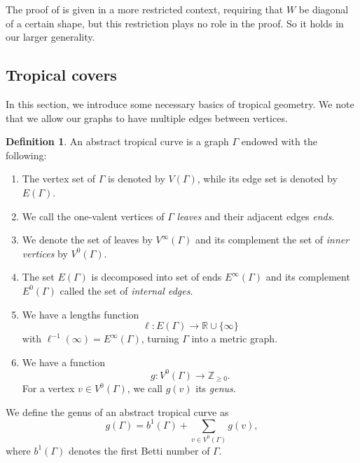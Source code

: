 \documentclass[10pt,a4paper,oneside,no-math,reqno]{amsart}%
\theoremstyle{plain}
\theoremstyle{definition}
\newtheorem{definition}[theorem]{Definition}
\theoremstyle{remark}
\numberwithin{equation}{section}
\newcommand{\1}{\mathds{1}}
\newcommand{\<}{\langle}
\renewcommand{\>}{\rangle}
\begin{document}
The proof of \cite[Proposition 4.1]{BDKS22} is given in a more restricted context, requiring that $W$ be diagonal of a certain shape, but this restriction plays no role in the proof. So it holds in our larger generality.



\subsection{Tropical covers}
\label{sec-tropcov}

In this section, we introduce some necessary basics of tropical geometry.
We note that we allow our graphs to have multiple edges between vertices.


\begin{definition}
    An abstract tropical curve is a graph $\Gamma$ endowed with the following:
    \begin{enumerate}
        \item The vertex set of $\Gamma$ is denoted by $V(\Gamma)$, while its edge set is denoted by $E(\Gamma)$.
        \item We call the one-valent vertices of $\Gamma$ \emph{leaves} and their adjacent edges \emph{ends}.
        \item We denote the set of leaves by $V^\infty(\Gamma)$ and its complement the set of \emph{inner vertices} by $V^0(\Gamma)$.
        \item The set $E(\Gamma)$ is decomposed into set of ends $E^\infty(\Gamma)$ and its complement $E^0(\Gamma)$ called the set of \emph{internal edges}.
        \item We have a lengths function
        \begin{equation}
            \ell \colon E(\Gamma)\to\mathbb{R}\cup\{\infty\}
        \end{equation}
        with $\ell^{-1}(\infty)=E^\infty(\Gamma)$, turning $\Gamma$ into a metric graph.
        \item We have a function
        \begin{equation}
            g \colon V^0(\Gamma)\to\mathbb{Z}_{\ge0}.
        \end{equation}
        For a vertex $v\in V^0(\Gamma)$, we call $g(v)$ its \emph{genus}.
    \end{enumerate}
    We define the genus of an abstract tropical curve as
    \begin{equation}
        g(\Gamma)
        =
        b^1(\Gamma)+\sum_{v\in V^0(\Gamma)}g(v),
    \end{equation}
    where $b^1(\Gamma)$ denotes the first Betti number of $\Gamma$.

\end{definition}
\end{document}
